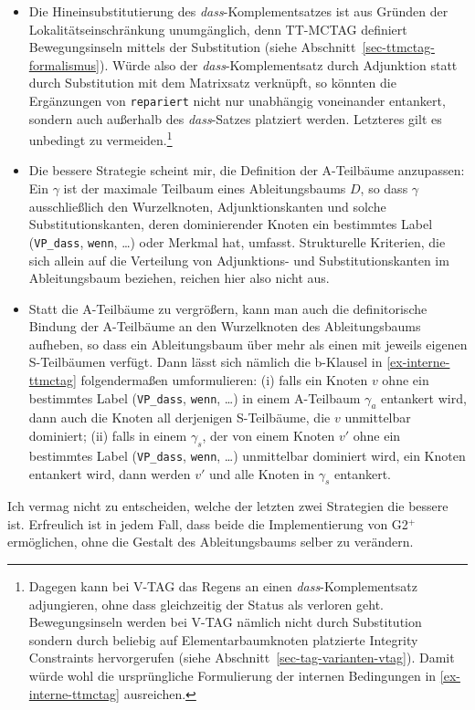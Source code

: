 \begin{itemize}
  \item Die Hineinsubstitutierung des {\it dass}-Komplementsatzes ist aus Gründen der Lokalitätseinschränkung unumgänglich, denn TT-MCTAG definiert Bewegungsinseln mittels der Substitution (siehe Abschnitt~\ref{sec-ttmctag-formalismus}). Würde also der {\it dass}-Komplementsatz durch Adjunktion statt durch Substitution mit dem Matrixsatz verknüpft, so könnten die Ergänzungen von {\tt repariert} nicht nur unabhängig voneinander entankert, sondern auch au\ss erhalb des {\it dass}-Satzes platziert werden. Letzteres gilt es unbedingt zu vermeiden.\footnote{Dagegen kann bei V-TAG das Regens an einen {\it dass}-Komplementsatz adjungieren, ohne dass gleichzeitig der Status als  verloren geht. Bewegungsinseln werden bei V-TAG nämlich nicht durch Substitution sondern durch beliebig auf Elementarbaumknoten platzierte Integrity Constraints hervorgerufen (siehe Abschnitt~\ref{sec-tag-varianten-vtag}). Damit würde wohl die ursprüngliche Formulierung der internen Bedingungen in \ref{ex-interne-ttmctag} ausreichen.}
  \item Die bessere Strategie scheint mir, die Definition der A-Teilbäume anzupassen: Ein  $\gamma$ ist der maximale Teilbaum eines Ableitungsbaums $D$, so dass $\gamma$ ausschlie\ss lich den Wurzelknoten, Adjunktionskanten und solche Substitutionskanten, deren dominierender Knoten ein bestimmtes Label ({\tt VP\_dass}, {\tt wenn}, \ldots) oder Merkmal hat, umfasst. Strukturelle Kriterien, die sich allein auf die Verteilung von Adjunktions- und Substitutionskanten im Ableitungsbaum beziehen, reichen hier also nicht aus.%
  \item Statt die A-Teilbäume zu vergrö\ss ern, kann man auch die definitorische Bindung der A-Teilbäume an den Wurzelknoten des Ableitungsbaums aufheben, so dass ein Ableitungsbaum über mehr als einen  mit jeweils eigenen S-Teilbäumen verfügt. Dann lässt sich nämlich die b-Klausel in \ref{ex-interne-ttmctag} folgenderma\ss en umformulieren: (i) falls ein Knoten $v$ ohne ein bestimmtes Label ({\tt VP\_dass}, {\tt wenn}, \ldots) in einem A-Teilbaum $\gamma_a$ entankert wird, dann auch die Knoten all derjenigen S-Teilbäume, die $v$ unmittelbar dominiert; (ii) falls in einem  $\gamma_s$, der von einem Knoten $v'$ ohne ein bestimmtes Label ({\tt VP\_dass}, {\tt wenn}, \ldots) unmittelbar dominiert wird, ein Knoten entankert wird, dann werden $v'$ und alle Knoten in $\gamma_s$ entankert.  
\end{itemize} 
Ich vermag nicht zu entscheiden, welche der letzten zwei Strategien die bessere ist. Erfreulich ist in jedem Fall, dass beide die Implementierung von G2$^+$ ermöglichen, ohne die Gestalt des Ableitungsbaums selber zu verändern. 

